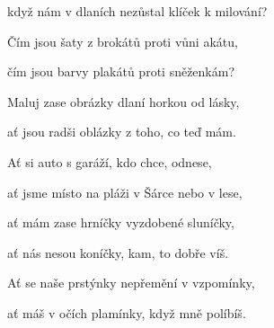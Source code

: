 když nám v dlaních nezůstal klíček k milování?

Čím jsou šaty z brokátů proti vůni akátu,

čím jsou barvy plakátů proti sněženkám?

\bigskip

Maluj zase obrázky dlaní horkou od lásky,

ať jsou radši oblázky z toho, co teď mám.
\ks



\zr
Ať si auto s garáží, kdo chce, odnese,

ať jsme místo na pláži v Šárce nebo v lese,

ať mám zase hrníčky vyzdobené sluníčky,

ať nás nesou koníčky, kam, to dobře víš.

\bigskip


Ať se naše prstýnky nepřemění v vzpomínky,

ať máš v očích plamínky, když mně políbíš.
\kr
\kp


